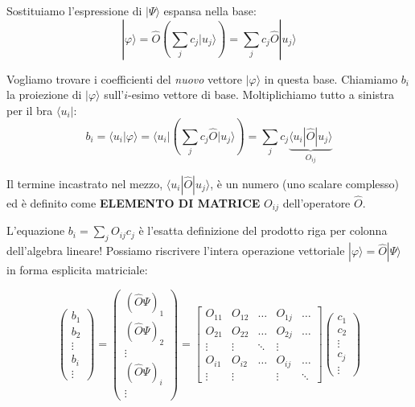 \documentclass[11pt, a4paper]{article}
\begin{document}
\noindent
Sostituiamo l'espressione di $|\Psi\rangle$ espansa nella base: %
\begin{equation*}
    |\varphi\rangle = \hat{O} \left( \sum_j c_j |u_j\rangle \right) = \sum_j c_j \hat{O} |u_j\rangle %
\end{equation*}

\noindent
Vogliamo trovare i coefficienti del \textit{nuovo} vettore $|\varphi\rangle$ in questa base. Chiamiamo $b_i$ la proiezione di $|\varphi\rangle$ sull'$i$-esimo vettore di base. Moltiplichiamo tutto a sinistra per il bra $\langle u_i|$: %
\begin{equation}
    b_i = \langle u_i|\varphi\rangle = \langle u_i| \left( \sum_j c_j \hat{O} |u_j\rangle \right) = \sum_j c_j \underbrace{ \langle u_i|\hat{O}|u_j\rangle }_{O_{ij}} %
\end{equation}

\noindent
Il termine incastrato nel mezzo, $\langle u_i|\hat{O}|u_j\rangle$, è un numero (uno scalare complesso) ed è definito come \textbf{ELEMENTO DI MATRICE} $O_{ij}$ dell'operatore $\hat{O}$. %

\noindent
L'equazione $b_i = \sum_j O_{ij} c_j$ è l'esatta definizione del prodotto riga per colonna dell'algebra lineare! %
Possiamo riscrivere l'intera operazione vettoriale $|\varphi\rangle = \hat{O}|\Psi\rangle$ in forma esplicita matriciale: %

\begin{equation}
    \begin{pmatrix} b_1 \\ b_2 \\ \vdots \\ b_i \\ \vdots \end{pmatrix} = \begin{pmatrix} (\hat{O}\Psi)_1 \\ (\hat{O}\Psi)_2 \\ \vdots \\ (\hat{O}\Psi)_i \\ \vdots \end{pmatrix} = \begin{bmatrix} O_{11} & O_{12} & \dots & O_{1j} & \dots \\ O_{21} & O_{22} & \dots & O_{2j} & \dots \\ \vdots & \vdots & \ddots & \vdots & \\ O_{i1} & O_{i2} & \dots & O_{ij} & \dots \\ \vdots & \vdots & & \vdots & \ddots \end{bmatrix} \begin{pmatrix} c_1 \\ c_2 \\ \vdots \\ c_j \\ \vdots \end{pmatrix} %
\end{equation}
\end{document}
